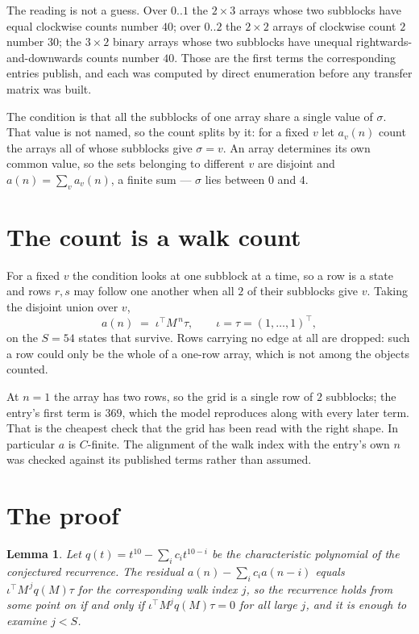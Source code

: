\documentclass[11pt,a4paper]{article}
\theoremstyle{plain}
\newtheorem{lemma}[theorem]{Lemma}
\theoremstyle{definition}
\begin{document}
The reading is not a guess. Over $0..1$ the $2\times3$ arrays whose two subblocks have equal
clockwise counts number $40$; over $0..2$ the $2\times2$ arrays of clockwise count $2$ number
$30$; the $3\times2$ binary arrays whose two subblocks have unequal rightwards-and-downwards
counts number $40$. Those are the first terms the corresponding entries publish, and each was
computed by direct enumeration before any transfer matrix was built.

The condition is that all the subblocks of one array share a single value of $\sigma$. That
value is not named, so the count splits by it: for a fixed $v$ let $a_v(n)$ count the arrays all
of whose subblocks give $\sigma=v$. An array determines its own common value, so the sets
belonging to different $v$ are disjoint and $a(n)=\sum_v a_v(n)$, a finite sum --- $\sigma$
lies between $0$ and $4$.

\section{The count is a walk count}

For a fixed $v$ the condition looks at one subblock at a time, so a row is
a state and rows $r,s$ may follow one another when all $2$ of their subblocks give $v$.
Taking the disjoint union over $v$,
\[
a(n)\;=\;\iota^{\!\top}M^{\,n}\tau,\qquad\iota=\tau=(1,\dots,1)^{\!\top},
\]
on the $S=54$ states that survive. Rows carrying no edge at all are dropped: such a row could
only be the whole of a one-row array, which is not among the objects counted.

At $n=1$ the array has two rows, so the grid is a single row of $2$
subblocks; the entry's first term is $369$, which the model
reproduces along with every later term. That is the cheapest check that the grid has been read
with the right shape.
In particular $a$ is $C$-finite. The alignment of the walk index with the entry's own $n$ was
checked against its published terms rather than assumed.

\section{The proof}

\begin{lemma}\label{lem:crit}
Let $q(t)=t^{10}-\sum_i c_it^{10-i}$ be the characteristic polynomial of the
conjectured recurrence. The residual $a(n)-\sum_ic_ia(n-i)$ equals
$\iota^{\!\top}M^{\,j}q(M)\tau$ for the corresponding walk index $j$, so the recurrence
holds from some point on if and only if $\iota^{\!\top}M^{j}q(M)\tau=0$ for all large $j$,
and it is enough to examine $j<S$.
\end{lemma}
\end{document}
